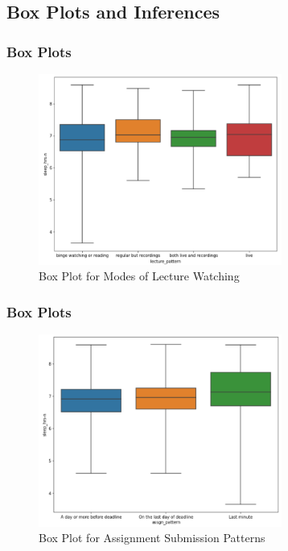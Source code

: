 \documentclass[11pt,]{beamer}
\begin{document}
\subsection{Box Plots and Inferences}

\begin{frame}

    \frametitle{Box Plots}
    
    \begin{figure}
		\includegraphics[width=8cm]{BoxPlt_Lecture.png}
		\caption{Box Plot for Modes of Lecture Watching}
	\end{figure}
	
\end{frame}

\begin{frame}

   \frametitle{Box Plots}
    
   \begin{figure}
		\includegraphics[width=8cm]{BoxPlt_Assignments.png}
		\caption{Box Plot for Assignment Submission Patterns}
	\end{figure}
    
\end{frame}
\end{document}
